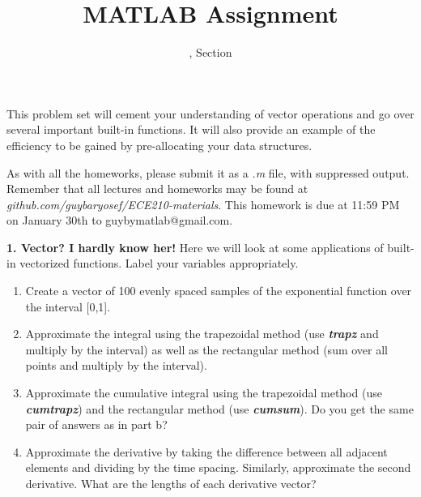 \documentclass[11pt]{article}
\title{MATLAB Assignment \Homework}
\author{\Session, Section \Section}
\date{}
\makeatletter
\def\MyEmail{guybymatlab@gmail.com}
\def\DateOfSubmission{January 30th }
\newenvironment{qparts}{\begin{enumerate}[{(}a{)}]}{\end{enumerate}}
\makeatother
\begin{document}
\maketitle
This problem set will cement your understanding of vector operations and
go over several important built-in functions.
It will also provide an example of the efficiency to be gained by pre-allocating
your data structures.

As with all the homeworks, please submit it as a \textit{.m} file, 
with suppressed output.
Remember that all lectures and homeworks may be found at 
\textit{github.com/guybaryosef/ECE210-materials}.
This homework is due at 11:59 PM on \DateOfSubmission to \MyEmail. 

\noindent
\newline
\textbf{1. Vector? I hardly know her!}
Here we will look at some applications of built-in vectorized functions.
Label your variables appropriately.
\begin{qparts}
    \item Create a vector of 100 evenly spaced samples of
    the exponential function over the interval [0,1].

    \item Approximate the integral using the trapezoidal method
    (use \textbf{\textit{trapz}} and multiply by the interval)
    as well as the rectangular method (sum over all points and multiply by the interval).

    \item Approximate the cumulative integral using the trapezoidal method
    (use \textbf{\textit{cumtrapz}}) and the rectangular method
    (use \textbf{\textit{cumsum}}).
    Do you get the same pair of answers as in part b?

    \item Approximate the derivative by taking the difference between
    all adjacent elements and dividing by the time spacing.
    Similarly, approximate the second derivative.
    What are the lengths of each derivative vector?

\end{qparts}
\end{document}
